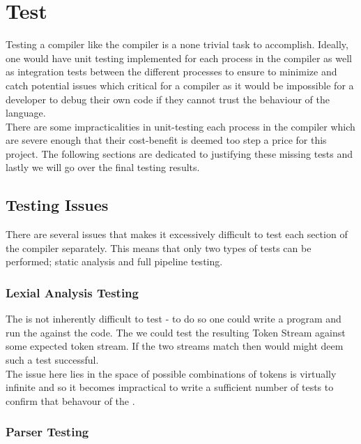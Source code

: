 \section{Test}
\label{sec:Test}

Testing a compiler like the \lang{} compiler is a none trivial task to
accomplish. Ideally, one would have unit testing implemented for each process in the
compiler as well as integration tests between the different processes to ensure
to minimize and catch potential issues which critical for a compiler as it would
be impossible for a developer to debug their own code if they cannot trust the
behaviour of the language. \\

There are some impracticalities in unit-testing each process in the \lang{} compiler
which are severe enough that their cost-benefit is deemed too step a price for this
project. The following sections are dedicated to justifying these missing tests and
lastly we will go over the final testing results.

\subsection{Testing Issues}

There are several issues that makes it excessively difficult to test each section of
the \lang{} compiler separately. This means that only two types of tests can be
performed; static analysis and full pipeline testing. 

\subsubsection{Lexial Analysis Testing}

The \lexer{} is not inherently difficult to test - to do so one could write a program
and run the \lexer{} against the code. The we could test the resulting Token Stream
against some expected token stream. If the two streams match then would might deem
such a test successful. \\

The issue here lies in the space of possible combinations of tokens is virtually
infinite and so it becomes impractical to write a sufficient number of tests to
confirm that behavour of the \lexer{}.

\subsubsection{Parser Testing}

